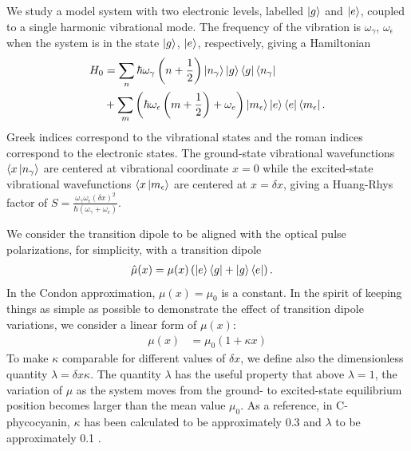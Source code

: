 We study a model system with two electronic levels, labelled $\ket{g}$ and $\ket{e}$, coupled to a single harmonic vibrational mode. The frequency of the vibration is $\omega_\gamma$, $\omega_\epsilon$ when the system is in the state $\ket{g}$, $\ket{e}$, respectively, giving a Hamiltonian
\begin{align}
	H_0 &=  \sum_n \hbar \omega_{\gamma}  \left(n + \frac{1}{2} \right)  \ket{n_{\gamma}}\ket{g}\bra{g} \bra{n_{\gamma}} \\
   &+ \sum_m \left(  \hbar \omega_{\epsilon}  \left(m + \frac{1}{2} \right) + \omega_e \right)  \ket{m_{\epsilon}} \ket{e}\bra{e} \bra{m_{\epsilon}}.
\end{align}
Greek indices correspond to the vibrational states and the roman indices correspond to the electronic states.  The ground-state vibrational wavefunctions $\langle x \ket{n_\gamma}$ are centered at vibrational coordinate $x=0$ while the excited-state vibrational wavefunctions $\langle x \ket{m_\epsilon}$ are centered at $x=\delta x$, giving a Huang-Rhys factor of $S=\frac{\omega_\gamma \omega_\epsilon(\delta x)^2}{\hbar (\omega_\gamma+\omega_\epsilon)}$.

We consider the transition dipole to be aligned with the optical pulse polarizations, for simplicity, with a transition dipole
\begin{align}
	\hat{\mu}(x) &= \mu (x)  \left( \ket{e}\bra{g} + \ket{g} \bra{e} \right).
\end{align}
In the Condon approximation, $\mu(x)=\mu_0$ is a constant. In the spirit of keeping things as simple as possible to demonstrate the effect of transition dipole variations, we consider a linear form of $\mu(x)$:
\begin{align}
	\mu(x) &= \mu_0\left( 1 +  \kappa x \right)
\end{align}
To make $\kappa$ comparable for different values of $\delta x$, we define also the dimensionless quantity $\lambda=\delta x \kappa$.
The quantity $\lambda$ has the useful property that above $\lambda=1$, the variation of $\mu$ as the system moves from the ground- to excited-state equilibrium position becomes larger than the mean value $\mu_0$.  As a reference, in C-phycocyanin, $\kappa$ has been calculated to be approximately 0.3 and $\lambda$ to be approximately 0.1 \cite{photosyntheticKappa}.

